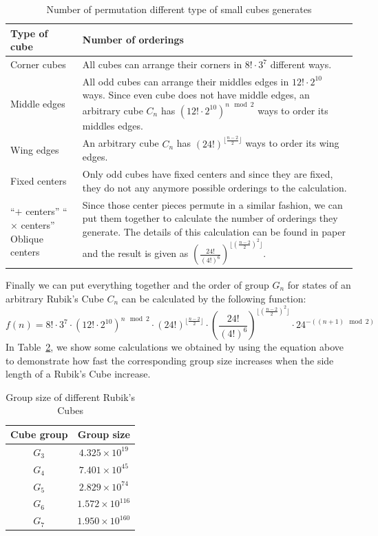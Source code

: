 \begin{table}[ht]
    \centering
    \begin{tabular}{|p{3cm}|p{11cm}|}
        \hline Type of cube & Number of orderings \\ \hline
        \hline Corner cubes & All cubes can arrange their corners in $8! \cdot 3^7$ different ways.  \\ 
        \hline Middle edges & All odd cubes can arrange their middles edges in $12! \cdot 2^{10}$ ways. Since even cube does not have middle edges, an arbitrary cube $C_n$ has $(12! \cdot 2^{10})^{n \mod 2}$ ways to order its middles edges. \\ 
        \hline Wing edges & An arbitrary cube $C_n$ has $(24!)^{\lfloor \frac{n - 2}{2} \rfloor}$ ways to order its wing edges. \\ 
        \hline Fixed centers & Only odd cubes have fixed centers and since they are fixed, they do not any anymore possible orderings to the calculation. \\ 
        \hline \pbox{3cm}{\vspace*{0.1cm} ``$+$ centers'' \\ ``$\times$ centers'' \\  Oblique centers \vspace*{0.1cm}} & \vspace*{-0.8cm} Since those center pieces permute in a similar fashion, we can put them together to calculate the number of orderings they generate. The details of this calculation can be found in paper\cite{size} and the result is given as $(\frac{24!}{(4!)^6})^{\lfloor (\frac{n - 2}{2})^2 \rfloor}$. \\ \hline
    \end{tabular}
    \caption{Number of permutation different type of small cubes generates}\label{tab:permutation}
\end{table}
Finally we can put everything together and the order of group $G_n$ for states of an arbitrary Rubik's Cube $C_n$ can be calculated by the following function:
$$f(n) = 8! \cdot 3^7 \cdot (12! \cdot 2^{10})^{n \mod 2} \cdot (24!)^{\lfloor \frac{n - 2}{2} \rfloor} \cdot (\frac{24!}{(4!)^6})^{\lfloor (\frac{n - 2}{2})^2 \rfloor} \cdot 24^{-((n + 1) \mod 2)}$$
In Table~\ref{tab:cube-size}, we show some calculations we obtained by using the equation above to demonstrate how fast the corresponding group size increases when the side length of a Rubik's Cube increase.
\begin{table}[ht]
    \centering
    \begin{tabular}{|c|c|}
        \hline Cube group & Group size \\
        \hline $G_3$ & $4.325 \times 10^{19}$ \\
        \hline $G_4$ & $7.401 \times 10^{45}$ \\
        \hline $G_5$ & $2.829 \times 10^{74}$ \\
        \hline $G_6$ & $1.572 \times 10^{116}$ \\
        \hline $G_7$ & $1.950 \times 10^{160}$ \\ \hline
    \end{tabular}
    \caption{Group size of different Rubik's Cubes}
    \label{tab:cube-size}
\end{table}
